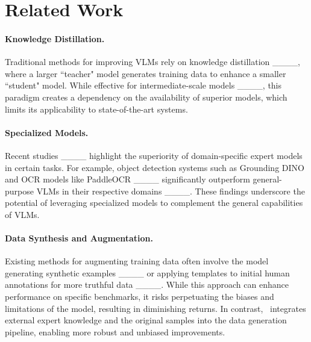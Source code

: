 \section{Related Work}
\paragraph{Knowledge Distillation.} Traditional methods for improving VLMs rely on knowledge distillation ____, where a larger ``teacher" model generates training data to enhance a smaller ``student" model. While effective for intermediate-scale models ____, this paradigm creates a dependency on the availability of superior models, which limits its applicability to state-of-the-art systems. %

\paragraph{Specialized Models.}Recent studies ____ highlight the superiority of domain-specific expert models in certain tasks. For example, object detection systems such as Grounding DINO and OCR models like PaddleOCR ____ significantly outperform general-purpose VLMs in their respective domains ____. These findings underscore the potential of leveraging specialized models to complement the general capabilities of VLMs.
\vspace{-2mm}
\paragraph{Data Synthesis and Augmentation.} Existing methods for augmenting training data often involve the model generating synthetic examples ____ or applying templates to initial human annotations for more truthful data ____. While this approach can enhance performance on specific benchmarks, it risks perpetuating the biases and limitations of the model, resulting in diminishing returns. In contrast, \aide~integrates external expert knowledge and the original samples into the data generation pipeline, enabling more robust and unbiased improvements.



\vspace{-2mm}